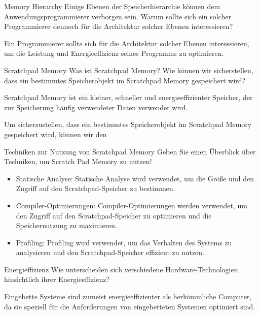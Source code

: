 \documentclass{article}
\begin{document}
\begin{exercise}{Memory Hierarchy}
  Einige Ebenen der Speicherhierarchie können dem Anwendungsprogrammierer verborgen sein. Warum sollte sich ein solcher Programmierer dennoch für die Architektur solcher Ebenen interessieren?

  \begin{solution}
    Ein Programmierer sollte sich für die Architektur solcher Ebenen interessieren, um die Leistung und Energieeffizienz seines Programms zu optimieren.
  \end{solution}
\end{exercise}

\begin{exercise}{Scratchpad Memory}
  Was ist Scratchpad Memory? Wie können wir sicherstellen, dass ein bestimmtes Speicherobjekt im Scratchpad Memory gespeichert wird?

  \begin{solution}
    Scratchpad Memory ist ein kleiner, schneller und energieeffizienter Speicher, der zur Speicherung häufig verwendeter Daten verwendet wird.

    Um sicherzustellen, dass ein bestimmtes Speicherobjekt im Scratchpad Memory gespeichert wird, können wir den
  \end{solution}
\end{exercise}

\begin{exercise}{Techniken zur Nutzung von Scratchpad Memory}
  Geben Sie einen Überblick über Techniken, um Scratch Pad Memory zu nutzen!

  \begin{solution}
    \begin{itemize}
      \item Statische Analyse: Statische Analyse wird verwendet, um die Größe und den Zugriff auf den Scratchpad-Speicher zu bestimmen.
      \item Compiler-Optimierungen: Compiler-Optimierungen werden verwendet, um den Zugriff auf den Scratchpad-Speicher zu optimieren und die Speichernutzung zu maximieren.
      \item Profiling: Profiling wird verwendet, um das Verhalten des Systems zu analysieren und den Scratchpad-Speicher effizient zu nutzen.
    \end{itemize}
  \end{solution}
\end{exercise}

\begin{exercise}{Energieffizienz}
  Wie unterscheiden sich verschiedene Hardware-Technologien hinsichtlich ihrer Energieeffizienz?

  \begin{solution}
    Eingebette Systeme sind zumeist energieeffizienter als herkömmliche Computer, da sie speziell für die Anforderungen von eingebetteten Systemen optimiert sind.
  \end{solution}
\end{exercise}
\end{document}
